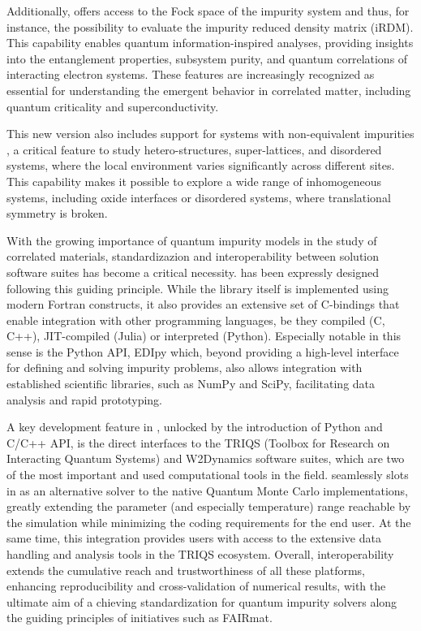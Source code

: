 \documentclass[edipack2.tex]{subfiles}
\begin{document}
Additionally, \NAME offers access to the Fock space of
the impurity system and thus, for instance, the possibility to
evaluate the impurity reduced density matrix
(iRDM). This capability enables quantum information-inspired analyses, providing insights into the entanglement properties, subsystem purity, and quantum correlations of interacting electron systems. These
features are increasingly recognized as essential for understanding the emergent behavior in correlated matter, including quantum criticality and superconductivity.

This new version also includes support for systems with non-equivalent impurities , a critical feature to study hetero-structures, super-lattices, and disordered systems, where the local environment varies significantly across different sites. This capability makes it 
possible to explore a wide range of inhomogeneous systems, including
oxide interfaces or disordered systems, where
translational symmetry is broken.


With the growing importance of  quantum impurity models in the study of correlated materials,
standardizazion and interoperability between solution software suites has
become a critical necessity.
\NAME has been expressly designed following this guiding principle. 
While the library itself is implemented using modern Fortran constructs, it also provides an extensive set of C-bindings that enable integration with other programming languages,
be they compiled (C, C++), JIT-compiled (Julia) or interpreted (Python). 
Especially notable in this sense is the Python API, EDIpy which, beyond providing a 
high-level interface for defining and solving impurity problems, also allows integration with established scientific libraries, such as NumPy and SciPy, facilitating data analysis and
rapid prototyping.

A key development feature in \NAME, unlocked by the introduction of Python and C/C++ API, 
is the direct interfaces to the TRIQS (Toolbox for Research on Interacting Quantum Systems) and
W2Dynamics software suites, which are two of the most important and used computational tools in
the field. \NAME seamlessly slots in as an alternative solver to the native Quantum Monte Carlo 
implementations, greatly extending the parameter (and especially temperature) range reachable by 
the simulation while minimizing the coding requirements for the end user.
At the same time, this integration provides \NAME users with access to the
extensive data handling and analysis tools in the TRIQS ecosystem. 
Overall, interoperability extends the cumulative reach and trustworthiness of all these platforms,
enhancing reproducibility and cross-validation of numerical results, with the ultimate aim of a
chieving standardization for quantum impurity solvers along the guiding principles of initiatives such as FAIRmat.
\end{document}
